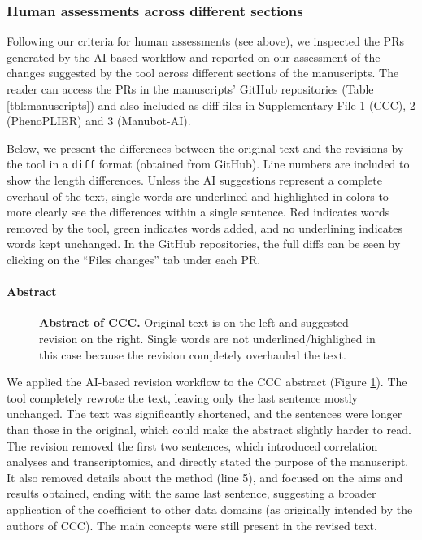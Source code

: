 \documentclass[
]{article}
\begin{document}
\subsubsection{Human assessments across different sections}

Following our criteria for human assessments (see above), we inspected the PRs generated by the AI-based workflow and reported on our assessment of the changes suggested by the tool across different sections of the manuscripts.
The reader can access the PRs in the manuscripts' GitHub repositories (Table \ref{tbl:manuscripts}) and also included as diff files in Supplementary File 1 (CCC), 2 (PhenoPLIER) and 3 (Manubot-AI).

Below, we present the differences between the original text and the revisions by the tool in a \texttt{diff} format (obtained from GitHub).
Line numbers are included to show the length differences.
Unless the AI suggestions represent a complete overhaul of the text, single words are underlined and highlighted in colors to more clearly see the differences within a single sentence.
Red indicates words removed by the tool, green indicates words added, and no underlining indicates words kept unchanged.
In the GitHub repositories, the full diffs can be seen by clicking on the ``Files changes'' tab under each PR.

\paragraph{Abstract}

\begin{figure}
\hypertarget{fig:abstract:ccc}{%
\centering

\caption{\textbf{Abstract of CCC.}
Original text is on the left and suggested revision on the right.
Single words are not underlined/highlighed in this case because the revision completely overhauled the text.}\label{fig:abstract:ccc}
}
\end{figure}

We applied the AI-based revision workflow to the CCC abstract (Figure \ref{fig:abstract:ccc}).
The tool completely rewrote the text, leaving only the last sentence mostly unchanged.
The text was significantly shortened, and the sentences were longer than those in the original, which could make the abstract slightly harder to read.
The revision removed the first two sentences, which introduced correlation analyses and transcriptomics, and directly stated the purpose of the manuscript.
It also removed details about the method (line 5), and focused on the aims and results obtained, ending with the same last sentence, suggesting a broader application of the coefficient to other data domains (as originally intended by the authors of CCC).
The main concepts were still present in the revised text.
\end{document}
